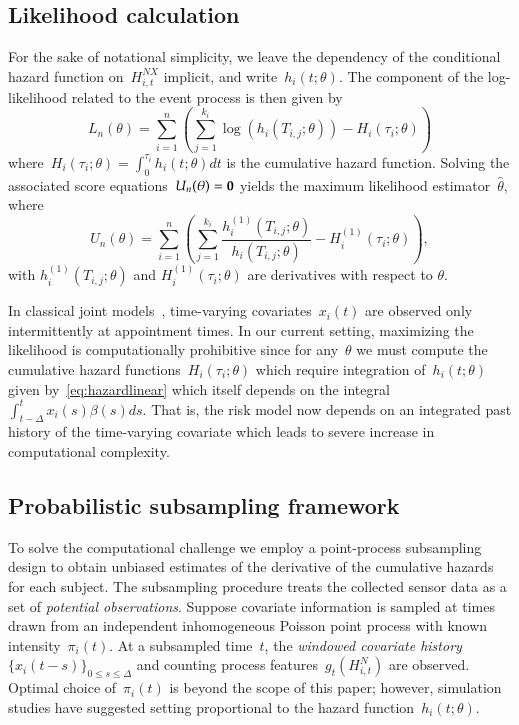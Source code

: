 \documentclass[11pt]{amsart}
\begin{document}
\subsection{Likelihood calculation}

For the sake of notational simplicity, we leave the dependency of the conditional hazard function on~$H_{i,t}^{NX}$ implicit, and write~$h_i (t; \theta)$. The component of the log-likelihood related to the event process is then given by
\[
  L_n (\theta) = \sum_{i=1}^{n} \left ( \sum_{j=1}^{k_i}
    \log \left( h_i \left( T_{i,j}; \theta
      \right) \right) - H_{i} \left( \tau_i; \theta \right) \right)
\]
where~$H_{i} (\tau_i ; \theta) = \int_{0}^{\tau_i} h_{i} (t; \theta) dt$ is the cumulative hazard function. Solving the associated score equations~$U_n (\theta) = {\bf 0}$ yields the maximum likelihood estimator~$\hat \theta$, where
\[
U_n (\theta) = \sum_{i=1}^{n} \left ( \sum_{j=1}^{k_i} \frac{h^{(1)}_i
    (T_{i,j}; \theta)}{h_i (T_{i,j}; \theta)} - H^{(1)}_{i} (\tau_i;
  \theta) \right),
\]
with $h_i^{(1)} (T_{i,j}; \theta)$ and $H_i^{(1)} (\tau_{i}; \theta)$ are derivatives with respect to $\theta$.

In classical joint models~\citep{Henderson2000, Tsiatis2004}, time-varying covariates~$x_i (t)$ are observed only intermittently at appointment times. In our current setting, maximizing the likelihood is computationally prohibitive since for any~$\theta$ we must compute the cumulative hazard functions~$H_{i} (\tau_i; \theta)$ which require integration of~$h_i(t;\theta)$ given by~\eqref{eq:hazardlinear} which itself depends on the integral~$\int_{t-\Delta}^t x_i (s) \beta(s) ds$.  That is, the risk model now depends on an integrated past history of the time-varying covariate which leads to severe increase in computational complexity.

\subsection{Probabilistic subsampling framework}

To solve the computational challenge we employ a point-process subsampling design to obtain unbiased estimates of the derivative of the cumulative hazards for each subject. The subsampling procedure treats the collected sensor data as a set of \emph{potential observations}. Suppose covariate information is sampled at times drawn from an independent inhomogeneous Poisson point process with known intensity~$\pi_i (t)$. At a subsampled time~$t$, the \emph{windowed covariate history} $\{ x_i (t-s)\}_{0 \leq s \leq \Delta}$ and counting process features~$g_t (H_{i,t}^N)$ are observed. Optimal choice of~$\pi_i (t)$ is beyond the scope of this paper; however, simulation studies have suggested setting proportional to the hazard function~$h_i (t; \theta)$.
\end{document}
